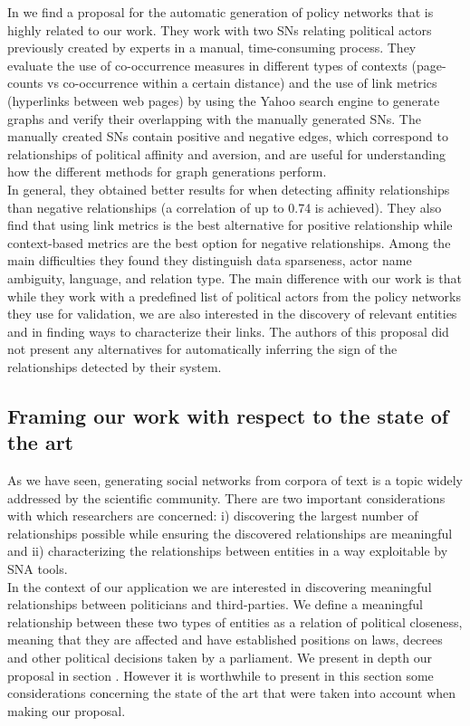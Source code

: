 In \cite{policy-networks} we find a proposal for the automatic generation of policy networks that is highly related to our work. They work with two SNs relating political actors previously created by experts in a manual, time-consuming process. They evaluate the use of co-occurrence measures in different types of contexts (page-counts vs co-occurrence within a certain distance) and the use of link metrics (hyperlinks between web pages) by using the Yahoo search engine to generate graphs and verify their overlapping with the manually generated SNs. The manually created SNs contain positive and negative edges, which correspond to relationships of political affinity and aversion, and are useful for understanding how the different methods for graph generations perform. \\

In general, they obtained better results for when detecting affinity relationships than negative relationships (a correlation of up to 0.74 is achieved). They also find that using link metrics is the best alternative for positive relationship while context-based metrics are the best option for negative relationships. Among the main difficulties they found they distinguish data sparseness, actor name ambiguity, language, and relation type.  The main difference with our work is that while they work with a predefined list of political actors from the policy networks they use for validation, we are also interested in the discovery of relevant entities and in finding ways to characterize their links. The authors of this proposal did not present any alternatives for automatically inferring the sign of the relationships detected by their system.\\

\subsection{Framing our work with respect to the state of the art}\label{framing}
 
As we have seen, generating social networks from corpora of text is a topic widely addressed by the scientific community. There are two important considerations with which researchers are concerned: i) discovering the largest number of relationships possible while ensuring the discovered relationships are meaningful and ii) characterizing the relationships between entities in a way exploitable by SNA tools. \\

In the context of our application we are interested in discovering meaningful relationships between politicians and third-parties. We define a meaningful relationship between these two types of entities as a relation of political closeness, meaning that they are affected and have established positions on laws, decrees and other political decisions taken by a parliament. We present in depth our proposal in section \cite{section:proposal}. However it is worthwhile to present in this section some considerations concerning the state of the art that were taken into account when making our proposal.\\

